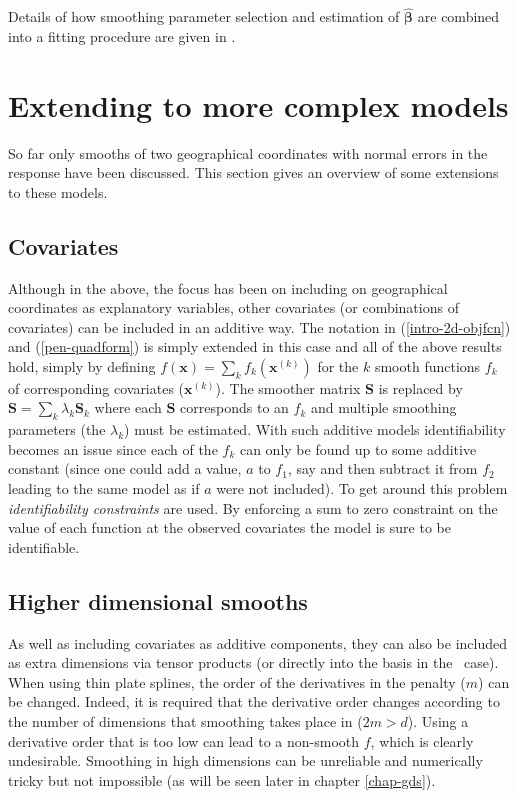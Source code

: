 Details of how smoothing parameter selection and estimation of $\bm{\hat{\beta}}$ are combined into a fitting procedure are given in .



\section{Extending to more complex models}
\label{intro-extending}

So far only smooths of two geographical coordinates with normal errors in the response have been discussed. This section gives an overview of some extensions to these models.

\subsection{Covariates}

Although in the above, the focus has been on including on geographical coordinates as explanatory variables, other covariates (or combinations of covariates) can be included in an additive way. The notation in (\ref{intro-2d-objfcn}) and (\ref{pen-quadform}) is simply extended in this case and all of the above results hold, simply by defining $f(\mathbf{x})=\sum_k f_k(\mathbf{x}^{(k)})$ for the $k$ smooth functions $f_k$ of corresponding covariates ($\mathbf{x}^{(k)}$). The smoother matrix $\mathbf{S}$ is replaced by $\mathbf{S}= \sum_k \lambda_k \mathbf{S}_k$ where each $\mathbf{S}$ corresponds to an $f_k$ and multiple smoothing parameters (the $\lambda_k$) must be estimated. With such additive models identifiability becomes an issue since each of the $f_k$ can only be found up to some additive constant (since one could add a value, $a$ to $f_1$, say and then subtract it from $f_2$ leading to the same model as if $a$ were not included). To get around this problem \textit{identifiability constraints} are used. By enforcing a sum to zero constraint on the value of each function at the observed covariates the model is sure to be identifiable. 

\subsection{Higher dimensional smooths}

As well as including covariates as additive components, they can also be included as extra dimensions via tensor products (or directly into the basis in the \tprs\ case). When using thin plate splines, the order of the derivatives in the penalty ($m$) can be changed. Indeed, it is required that the derivative order changes according to the number of dimensions that smoothing takes place in ($2m>d$). Using a derivative order that is too low can lead to a non-smooth $f$, which is clearly undesirable. Smoothing in high dimensions can be unreliable and numerically tricky but not impossible (as will be seen later in chapter \ref{chap-gds}).

